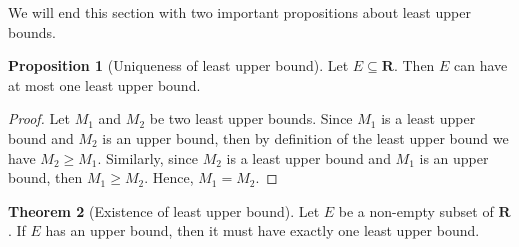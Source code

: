 \documentclass[12pt,a4paper]{article}
\theoremstyle{definition}
\newtheorem{theorem}{Theorem}[section]
\newtheorem{proposition}[theorem]{Proposition}
\newtheorem{example}{Example}[section]
\begin{document}

We will end this section with two important propositions about least upper bounds.

\begin{proposition}[Uniqueness of least upper bound]
  Let $E \subseteq \textbf{R}$. Then $E$ can have at most one least upper bound.
\end{proposition}

\begin{proof}
  Let $M_1$ and $M_2$ be two least upper bounds. Since $M_1$ is a least upper bound and $M_2$ is an upper bound, then by definition of the least upper bound we have $M_2 \geq M_1$. Similarly, since $M_2$ is a least upper bound and $M_1$ is an upper bound, then $M_1 \geq M_2$. Hence, $M_1 = M_2$. 
\end{proof}

\begin{theorem}[Existence of least upper bound]
  Let $E$ be a non-empty subset of $\textbf{R}$. If $E$ has an upper bound, then it must have exactly one least upper bound.
\end{theorem}
\end{document}
